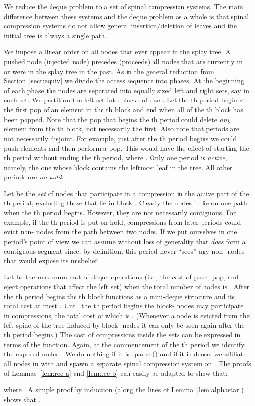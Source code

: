 \documentclass{article}
\newenvironment{proof}{\noindent {\bf Proof:}}{\hfill}
\begin{document}
\begin{proof}
We reduce the deque problem to a set of spinal compression systems.  The main difference
between these systems and the deque problem as a whole is that spinal compression systems
do not allow general insertion/deletion of leaves and the initial tree is always a single path.

We impose a linear order on all nodes that
ever appear in the splay tree.  A pushed node (injected node) precedes (proceeds)
all nodes that are currently in or were in the splay tree in the past.  
As in the general reduction from Section~\ref{sect:equiv} we divide the access sequence into phases.
At the beginning of each phase the nodes are separated into equally sized left and right sets, say  in each set.
We partition the left set into blocks of size .
Let the th period begin at the first pop of an element in the th block and end
when all of the th block has been popped.  Note that the pop that begins the th period
could delete {\em any} element from the th block, not necessarily the first.
Also note that periods are not necessarily disjoint.  For example, just after the th period begins
we could push  elements and then perform a pop.  This would have the effect of starting the
th period without ending the th period, where .  Only one period is {\em active}, namely, the 
one whose block contains the leftmost leaf in the tree.  All other periods are {\em on hold}.

Let  be the {\em set} of nodes that participate in a compression in the active part of the th period,
excluding those that lie in block .  Clearly the nodes in  lie on one path when the th period begins.
However, they are not necessarily contiguous.  For example, if the th period is put on hold, compressions
from later periods could evict non- nodes from the path between two  nodes.
If we put ourselves in one period's point of view we can assume without loss of generality that  {\em does}
form a contiguous segment since, by definition, this period never ``sees'' any non- nodes that would expose 
its misbelief.

Let  be the maximum cost of deque operations (i.e., the cost of push, pop, and eject operations that affect the left set)
when the total number of nodes is .
After the th period begins the th block functions as a mini-deque structure and its total cost at most .
Until the th period begins the block- nodes may participate in compressions, the total cost of which is .
(Whenever a node is evicted from the left spine of the tree induced by block- nodes it can only be seen again
after the th period begins.)
The cost of compressions inside the  sets can be expressed in terms of the  function.
Again, at the commencement of the th period we identify the exposed nodes .
We do nothing if it is sparse () and if it is dense, we affiliate all nodes in  with  and spawn a separate
spinal compression system on .
The proofs of Lemmas~\ref{lem:rec-a} and \ref{lem:rec-b} can easily be adapted to show that:

\noindent where .
A simple proof by induction (along the lines of Lemma~\ref{lem:alphastar}) shows that .
\end{proof}
\end{document}
